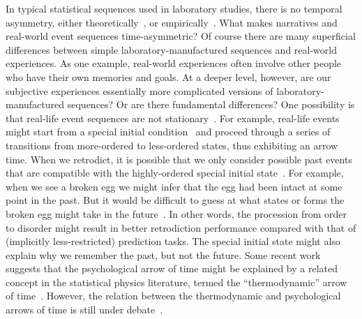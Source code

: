 \documentclass[10pt]{article}
\begin{document}
In typical statistical sequences used in laboratory studies, there is no
temporal asymmetry, either theoretically~\citep{Cove94, BialEtal01,
ElliEtal09}, or empirically~\citep{JonePash07}. What makes narratives and
real-world event sequences time-asymmetric? Of course there are many
superficial differences between simple laboratory-manufactured sequences and
real-world experiences. As one example, real-world experiences often involve
other people who have their own memories and goals. At a deeper level, however,
are our subjective experiences essentially more complicated versions of
laboratory-manufactured sequences? Or are there fundamental differences? One
possibility is that real-life event sequences are not stationary~\citep[i.e.,
not in equilibrium,][]{Cove94}. For example, real-life events might start from
a special initial condition~\citep{Albe00, Feyn65, Cove94} and proceed through
a series of transitions from more-ordered to less-ordered states, thus
exhibiting an arrow time. When we retrodict, it is possible that we only
consider possible past events that are compatible with the highly-ordered
special initial state~\citep{Carr10, Carr16}. For example, when we see a broken
egg we might infer that the egg had been intact at some point in the past. But
it would be difficult to guess at what states or forms the broken egg might
take in the future~\citep{Carr10, Carr16}. In other words, the procession from
order to disorder might result in better retrodiction performance compared with
that of (implicitly less-restricted) prediction tasks. The special initial
state might also explain why we remember the past, but not the future. Some
recent work suggests that the psychological arrow of time might be explained by
a related concept in the statistical physics literature, termed the
``thermodynamic'' arrow of time~\citep{MlodBrun14, Rove22}. However, the
relation between the thermodynamic and psychological arrows of time is still
under debate~\citep{Golo21, HemmShen19}.
\end{document}
